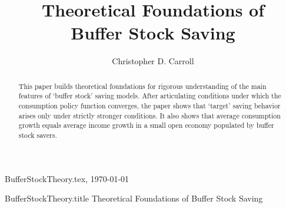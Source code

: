 \documentclass[titlepage]{\econtex}\providecommand{\texname}{BufferStockTheory}%
\providecommand{\onlyinsubfile}{}
\providecommand{\notinsubfile}{}
\renewcommand{\onlyinsubfile}[1]{}
\renewcommand{\notinsubfile}[1]{#1} %
\begin{document}

\renewcommand{\onlyinsubfile}[1]{}\renewcommand{\notinsubfile}[1]{#1} %

\hfill{\tiny \texname.tex, \today}

\begin{verbatimwrite}{\texname.title}
Theoretical Foundations of Buffer Stock Saving
\end{verbatimwrite}


\title{Theoretical Foundations of \\ Buffer Stock Saving}

\author{Christopher D. Carroll\authNum}






\hypertarget{abstract}{}
\begin{abstract}
  This paper builds theoretical foundations for rigorous understanding of the main features of `buffer stock' saving models.  After articulating conditions under which the consumption policy function converges, the paper shows that `target' saving behavior arises only under strictly stronger conditions.  It also shows that average consumption growth equals average income growth in a small open economy populated by buffer stock savers.
\end{abstract}
\end{document}
